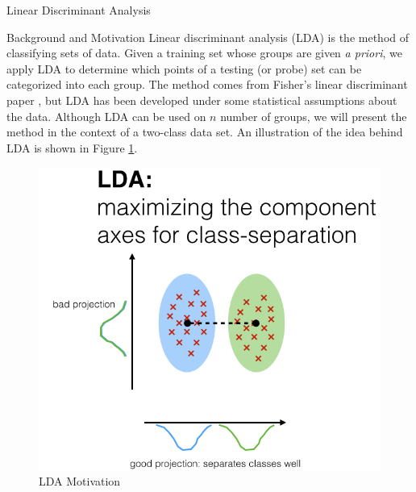 \begin{section}{Linear Discriminant Analysis}

\begin{subsection}{Background and Motivation}
Linear discriminant analysis (LDA) is the method of classifying sets of data. Given a training set whose groups are given \textit{a priori}, we apply LDA to determine which points of a testing (or probe) set can be categorized into each group. The method comes from Fisher's linear discriminant paper \cite{fisher}, but LDA has been developed under some statistical assumptions about the data. Although LDA can be used on $n$ number of groups, we will present the method in the context of a two-class data set. An illustration of the idea behind LDA is shown in Figure \ref{fig:lda_1}.
\\
\begin{minipage}{1.0\textwidth}
    \begin{figure}[H]
    \centering
    \includegraphics[trim={0cm 0cm 0cm 0cm},clip,width=0.6\columnwidth]{lda_1}
    \caption{LDA Motivation \cite{lda_1}}
    \label{fig:lda_1}
    \end{figure}
\end{minipage}

\end{subsection}


\end{section}
